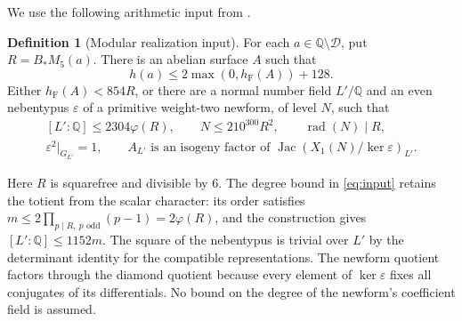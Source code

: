 \documentclass[11pt,a4paper]{article}
\theoremstyle{definition}
\newtheorem{definition}[theorem]{Definition}
\newcommand{\Q}{\mathbb Q}
\newcommand{\hF}{h_{\mathrm F}}
\newcommand{\rad}{\operatorname{rad}}
\newcommand{\Jac}{\operatorname{Jac}}
\begin{document}
We use the following arithmetic input from
\cite[proof of \texttt{o8-height}, equations
\textup{(LR2)--(LR5)}, and proof of
\texttt{quartic-height19}]{Glazer}.

\begin{definition}[Modular realization input]\label{def:input}
For each $a\in\Q\setminus\mathcal D$, put $R=B_*M_5(a)$.
There is an abelian surface $A$ such that
\begin{equation}\label{eq:geometric}
 h(a)\le2\max(0,\hF(A))+128.
\end{equation}
Either $\hF(A)<854R$, or there are a normal number field $L'/\Q$
and an even nebentypus $\varepsilon$ of a primitive weight-two
newform, of level $N$, such that
\begin{equation}\label{eq:input}
 \begin{gathered}
 [L':\Q]\le2304\varphi(R),\qquad
 N\le210^{300}R^2,\qquad \rad(N)\mid R,\\
 \varepsilon^2|_{G_{L'}}=1,
 \qquad
 A_{L'}\text{ is an isogeny factor of }
       \Jac(X_1(N)/\ker\varepsilon)_{L'}.
 \end{gathered}
\end{equation}
\end{definition}

Here $R$ is squarefree and divisible by $6$.
The degree bound in \eqref{eq:input} retains the totient from the
scalar character: its order satisfies
$m\le2\prod_{p\mid R,\ p\text{ odd}}(p-1)=2\varphi(R)$,
and the construction gives $[L':\Q]\le1152m$.
The square of the nebentypus is trivial over $L'$ by the determinant
identity for the compatible representations. The newform quotient
factors through the diamond quotient because every element of
$\ker\varepsilon$ fixes all conjugates of its differentials.
No bound on the degree of the newform's coefficient field is assumed.
\end{document}
